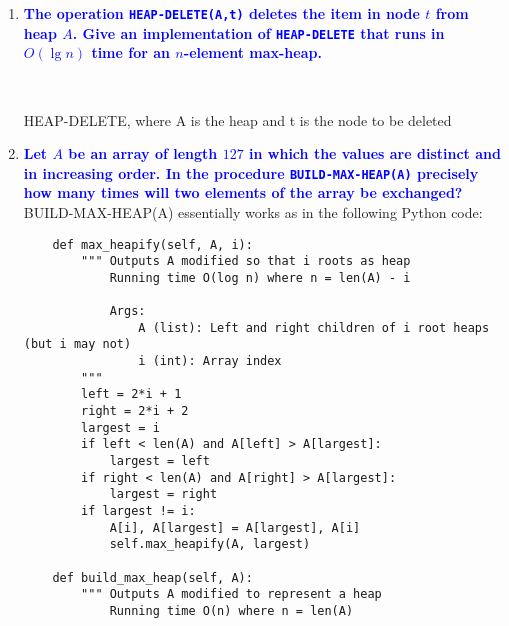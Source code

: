 \documentclass[11pt]{article}
\begin{document}
\begin{enumerate}
\item \textbf{\textcolor{blue}{The operation {\tt HEAP-DELETE(A,t)} deletes the item in node $t$
from heap $A$.  Give an implementation of {\tt HEAP-DELETE} that runs in
$O(\lg n)$ time for an $n$-element max-heap.}}
    \\
    \begin{algorithm}[H]
        \Indm{}\\
        \Indp
        \caption{HEAP-DELETE, where A is the heap and t is the node to be deleted}
    \end{algorithm}

\item \textbf{\textcolor{blue}{Let $A$ be an array of length $127$ in which the values are distinct and in increasing order. In the procedure {\tt BUILD-MAX-HEAP(A)} precisely how many times will two elements of the array be exchanged?}}
    \\ BUILD-MAX-HEAP(A) essentially works as in the following Python code:
    \begin{verbatim}
    def max_heapify(self, A, i):
        """ Outputs A modified so that i roots as heap
            Running time O(log n) where n = len(A) - i
            
            Args:
                A (list): Left and right children of i root heaps (but i may not)
                i (int): Array index
        """
        left = 2*i + 1
        right = 2*i + 2
        largest = i
        if left < len(A) and A[left] > A[largest]:
            largest = left
        if right < len(A) and A[right] > A[largest]:
            largest = right
        if largest != i:
            A[i], A[largest] = A[largest], A[i]
            self.max_heapify(A, largest)

    def build_max_heap(self, A):
        """ Outputs A modified to represent a heap
            Running time O(n) where n = len(A)
            

\end{verbatim}
\end{enumerate}
\end{document}
